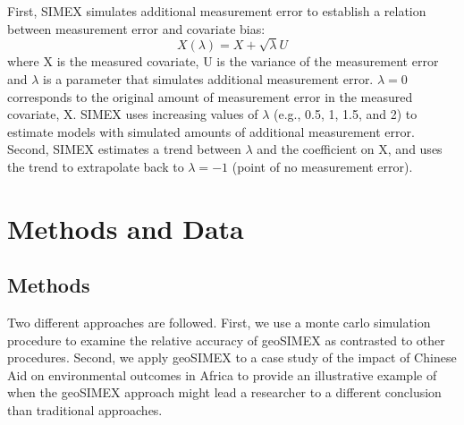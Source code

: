 First, SIMEX simulates additional measurement error to establish a relation between measurement error and covariate bias:
\begin{equation}
X(\lambda) = X + \sqrt{\lambda}U
\end{equation}
where X is the measured covariate, U is the variance of the measurement error and $\lambda$ is a parameter that simulates additional measurement error. 
$\lambda=0$ corresponds to the original amount of measurement error in the measured covariate, X. 
SIMEX uses increasing values of $\lambda$ (e.g., 0.5, 1, 1.5, and 2) to estimate models with simulated amounts of additional measurement error. 
Second, SIMEX estimates a trend between $\lambda$ and the coefficient on X, and uses the trend to extrapolate back to $\lambda = -1$ (point of no measurement error).







\newpage

\section{Methods and Data}
\subsection{Methods}
Two different approaches are followed. 
First, we use a monte carlo simulation procedure to examine the relative accuracy of geoSIMEX as contrasted to other procedures.  
Second, we apply geoSIMEX to a case study of the impact of Chinese Aid on environmental outcomes in Africa to provide an illustrative example of when the geoSIMEX approach might lead a researcher to a different conclusion than traditional approaches.

